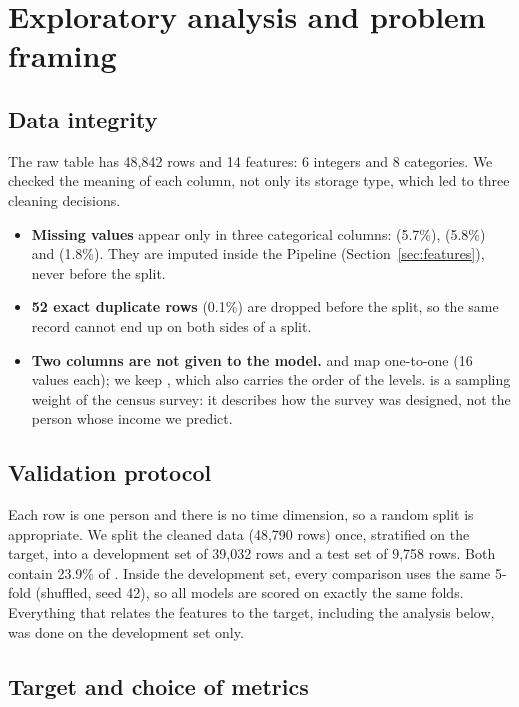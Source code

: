 \section{Exploratory analysis and problem framing}
\label{sec:eda}

\subsection{Data integrity}

The raw table has 48{,}842 rows and 14 features: 6 integers and 8 categories. We
checked the meaning of each column, not only its storage type, which led to
three cleaning decisions.
\begin{itemize}
  \item \textbf{Missing values} appear only in three categorical columns:
   (5.7\%),  (5.8\%) and 
  (1.8\%). They are imputed inside the Pipeline (Section~\ref{sec:features}),
  never before the split.
  \item \textbf{52 exact duplicate rows} (0.1\%) are dropped before the split,
  so the same record cannot end up on both sides of a split.
  \item \textbf{Two columns are not given to the model.}  and
   map one-to-one (16 values each); we keep
  , which also carries the order of the levels.
   is a sampling weight of the census survey: it describes how the
  survey was designed, not the person whose income we predict.
\end{itemize}

\subsection{Validation protocol}

Each row is one person and there is no time dimension, so a random split is
appropriate. We split the cleaned data (48{,}790 rows) once, stratified on the
target, into a development set of 39{,}032 rows and a test set of 9{,}758 rows.
Both contain 23.9\% of \pos. Inside the development set, every comparison uses
the same 5-fold  (shuffled, seed 42), so all models are
scored on exactly the same folds. Everything that relates the features to the
target, including the analysis below, was done on the development set only.

\subsection{Target and choice of metrics}

